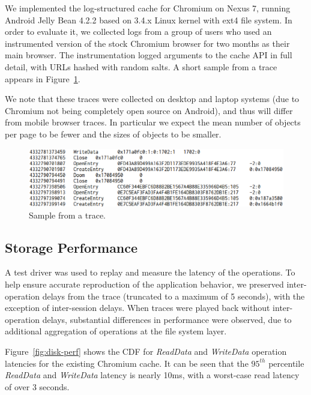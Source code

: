 \documentclass{sig-alternate}
\begin{document}
We implemented the log-structured cache for Chromium on Nexus 7, running Android
Jelly Bean 4.2.2 based on 3.4.x Linux kernel with ext4 file system.  In order to
evaluate it, we collected logs from a group of users who used an instrumented
version of the stock Chromium browser for two months as their main browser.  The
instrumentation logged arguments to the cache API in full detail, with URLs
hashed with random salts.  A short sample from a trace appears in
Figure~\ref{fig:trace}.

We note that these traces were collected on desktop and laptop systems (due to
Chromium not being completely open source on Android), and thus will differ from
mobile browser traces. In particular we expect the mean number of objects per
page to be fewer and the sizes of objects to be smaller.

\begin{figure}[t]
  \begin{center}
    \includegraphics[width=1.04\columnwidth]{graphs/trace}
  \end{center}
  \caption{Sample from a trace.}
  \label{fig:trace}
\vspace{-0.2in}
\end{figure}

\subsection{Storage Performance}

A test driver was used to replay and measure the latency of the operations. To
help ensure accurate reproduction of the application behavior, we preserved
inter-operation delays from the trace (truncated to a maximum of 5 seconds),
with the exception of inter-session delays.  When traces were played back
without inter-operation delays, substantial differences in performance were
observed, due to additional aggregation of operations at the file system layer.

Figure~\ref{fig:disk-perf} shows the CDF for \emph{ReadData} and
\emph{WriteData} operation latencies for the existing Chromium cache.  It can be
seen that the $95^{th}$ percentile \emph{ReadData} and \emph{WriteData} latency
is nearly 10ms, with a worst-case read latency of over 3 seconds.
\end{document}
